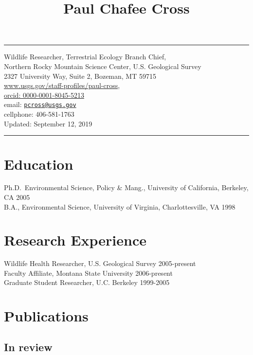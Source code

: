 \documentclass[12pt,]{article}
\title{Paul Chafee Cross}
\author{}
\date{}
\begin{document}
\maketitle

\hrule
\centering

Wildlife Researcher, Terrestrial Ecology Branch Chief,\\
Northern Rocky Mountain Science Center, U.S. Geological Survey\\
2327 University Way, Suite 2, Bozeman, MT 59715\\
\href{http://www.usgs.gov/staff-profiles/paul-cross}{www.usgs.gov/staff-profiles/paul-cross},\\
\href{http://orcid.org/0000-0001-8045-5213}{orcid:
0000-0001-8045-5213}\\
email: \href{mailto:pcross@usgs.gov}{\nolinkurl{pcross@usgs.gov}}\\
cellphone: 406-581-1763\\
Updated: September 12, 2019

\hrule

\raggedright

\hypertarget{education}{%
\section{Education}\label{education}}

Ph.D.~Environmental Science, Policy \& Mang., University of California,
Berkeley, CA \hfill 2005\\
B.A., Environmental Science, University of Virginia, Charlottesville, VA
\hfill 1998

\hypertarget{research-experience}{%
\section{Research Experience}\label{research-experience}}

Wildlife Health Researcher, U.S. Geological Survey \hfill 2005-present\\
Faculty Affiliate, Montana State University \hfill 2006-present\\
Graduate Student Researcher, U.C. Berkeley \hfill 1999-2005

\hypertarget{publications}{%
\section{Publications}\label{publications}}

\hypertarget{in-review}{%
\subsection{In review}\label{in-review}}
\end{document}
